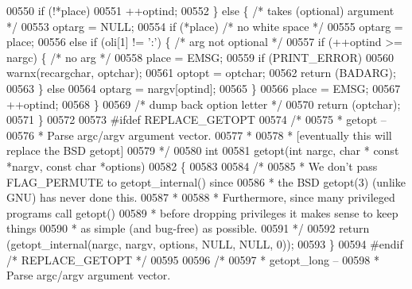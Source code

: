 \begin{DoxyCode}
{{{{{{{{{{{00550         \textcolor{keywordflow}{if} (!*place)
00551             ++optind;
00552     \} \textcolor{keywordflow}{else} \{                \textcolor{comment}{/* takes (optional) argument */}
00553         optarg = NULL;
00554         \textcolor{keywordflow}{if} (*place)         \textcolor{comment}{/* no white space */}
00555             optarg = place;
00556         \textcolor{keywordflow}{else} \textcolor{keywordflow}{if} (oli[1] != \textcolor{charliteral}{':'}) \{   \textcolor{comment}{/* arg not optional */}
00557             \textcolor{keywordflow}{if} (++optind >= nargc) \{    \textcolor{comment}{/* no arg */}
00558                 place = EMSG;
00559                 \textcolor{keywordflow}{if} (PRINT\_ERROR)
00560                     warnx(recargchar, optchar);
00561                 optopt = optchar;
00562                 \textcolor{keywordflow}{return} (BADARG);
00563             \} \textcolor{keywordflow}{else}
00564                 optarg = nargv[optind];
00565         \}
00566         place = EMSG;
00567         ++optind;
00568     \}
00569     \textcolor{comment}{/* dump back option letter */}
00570     \textcolor{keywordflow}{return} (optchar);
00571 \}
00572 
00573 \textcolor{preprocessor}{#ifdef REPLACE\_GETOPT}
00574 \textcolor{comment}{/*}
00575 \textcolor{comment}{ * getopt --}
00576 \textcolor{comment}{ *  Parse argc/argv argument vector.}
00577 \textcolor{comment}{ *}
00578 \textcolor{comment}{ * [eventually this will replace the BSD getopt]}
00579 \textcolor{comment}{ */}
00580 \textcolor{keywordtype}{int}
00581 getopt(\textcolor{keywordtype}{int} nargc, \textcolor{keywordtype}{char} * \textcolor{keyword}{const} *nargv, \textcolor{keyword}{const} \textcolor{keywordtype}{char} *options)
00582 \{
00583 
00584     \textcolor{comment}{/*}
00585 \textcolor{comment}{     * We don't pass FLAG\_PERMUTE to getopt\_internal() since}
00586 \textcolor{comment}{     * the BSD getopt(3) (unlike GNU) has never done this.}
00587 \textcolor{comment}{     *}
00588 \textcolor{comment}{     * Furthermore, since many privileged programs call getopt()}
00589 \textcolor{comment}{     * before dropping privileges it makes sense to keep things}
00590 \textcolor{comment}{     * as simple (and bug-free) as possible.}
00591 \textcolor{comment}{     */}
00592     \textcolor{keywordflow}{return} (getopt\_internal(nargc, nargv, options, NULL, NULL, 0));
00593 \}
00594 \textcolor{preprocessor}{#endif }\textcolor{comment}{/* REPLACE\_GETOPT */}\textcolor{preprocessor}{}
00595 
00596 \textcolor{comment}{/*}
00597 \textcolor{comment}{ * getopt\_long --}
00598 \textcolor{comment}{ *  Parse argc/argv argument vector.}
}}}}}}}}}}}
\end{DoxyCode}
